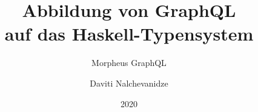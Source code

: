 \documentclass[aspectratio=169,t,xcolor=table]{beamer}
\begin{document}
\title[Inf UFG]{Abbildung von GraphQL \\ auf das Haskell-Typensystem}
\subtitle{Morpheus GraphQL}

\author{Daviti Nalchevanidze}

\date{2020}
\frame[noframenumbering]{\titlepage}






\titlepage


\end{document}

